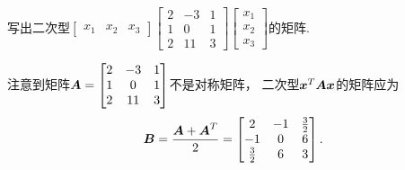\begin{example}
写出二次型\(\begin{bmatrix}
	x_1 & x_2 & x_3
\end{bmatrix}
\begin{bmatrix}
	2 & -3 & 1 \\
	1 & 0 & 1 \\
	2 & 11 & 3
\end{bmatrix}
\begin{bmatrix}
	x_1 \\ x_2 \\ x_3
\end{bmatrix}\)的矩阵.
\begin{solution}
注意到矩阵\(\boldsymbol{A} = \begin{bmatrix}
	2 & -3 & 1 \\
	1 & 0 & 1 \\
	2 & 11 & 3
\end{bmatrix}\)不是对称矩阵，
二次型\(\boldsymbol{x}^T\boldsymbol{A}\boldsymbol{x}\)的矩阵应为\begin{equation*}
	\boldsymbol{B}
	= \frac{\boldsymbol{A}+\boldsymbol{A}^T}{2}
	= \begin{bmatrix}
		2 & -1 & \frac{3}{2} \\
		-1 & 0 & 6 \\
		\frac{3}{2} & 6 & 3
	\end{bmatrix}.
\end{equation*}
\end{solution}
\end{example}

